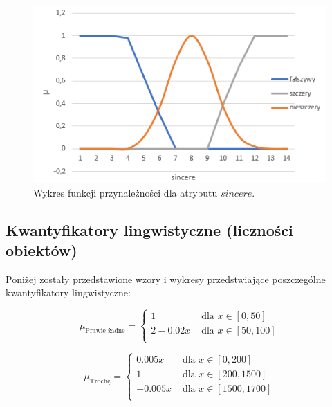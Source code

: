 \documentclass{classrep}
\begin{document}
\begin{enumerate}
  
  \begin{figure}[H]
    \includegraphics{fp_s.png}
    \caption{Wykres funkcji przynależności dla atrybutu \(sincere\).}
    \end{figure}

\end{enumerate}



\subsection{Kwantyfikatory lingwistyczne (liczności obiektów)}

Poniżej zostały przedstawione wzory i wykresy przedstwiające poszczególne kwantyfikatory lingwistyczne:

 \begin{equation}
    \mu_{\text{Prawie żadne}} = 
    \begin{cases}
        1 & \text{ dla } x \in [0,50] \\
        2 - 0.02x & \text{ dla } x \in [50,100] \\
      \end{cases}
  \end{equation}

  \begin{equation}
    \mu_{\text{Trochę}} =
      \begin{cases}
        0.005x & \text{ dla } x \in [0,200] \\
        1 & \text{ dla } x \in [200,1500] \\
        -0.005x & \text{ dla } x \in [1500,1700] \\
      \end{cases}  
  \end{equation}
  
\end{document}
